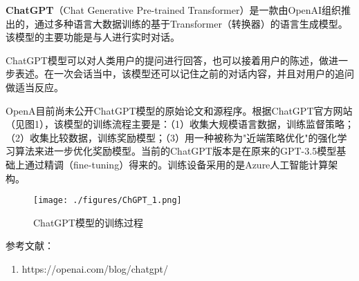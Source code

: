 
\textbf{ChatGPT}（Chat Generative Pre-trained Transformer）是一款由OpenAI组织推出的，通过多种语言大数据训练的基于Transformer（转换器）的语言生成模型。该模型的主要功能是与人进行实时对话。

ChatGPT模型可以对人类用户的提问进行回答，也可以接着用户的陈述，做进一步表述。在一次会话当中，该模型还可以记住之前的对话内容，并且对用户的追问做适当反应。

OpenA目前尚未公开ChatGPT模型的原始论文和源程序。根据ChatGPT官方网站（见图1），该模型的训练流程主要是：（1）收集大规模语言数据，训练监督策略；（2）收集比较数据，训练奖励模型；（3）用一种被称为"近端策略优化"的强化学习算法来进一步优化奖励模型。当前的ChatGPT版本是在原来的GPT-3.5模型基础上通过精调（fine-tuning）得来的。训练设备采用的是Azure人工智能计算架构。
\begin{figure}[ht]
\centering
\texttt{[image: ./figures/ChGPT\_1.png]}
\caption{ChatGPT模型的训练过程} \label{ChGPT_fig1}
\end{figure}




参考文献：
\begin{enumerate}
\item https://openai.com/blog/chatgpt/
\end{enumerate}